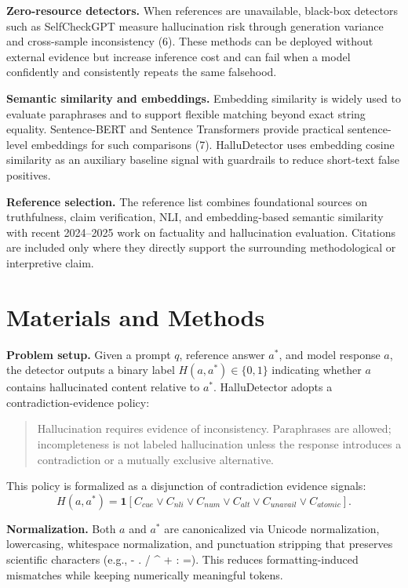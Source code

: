 \documentclass[11pt]{article}
\begin{document}
\textbf{Zero-resource detectors.} When references are unavailable, black-box detectors such as SelfCheckGPT measure hallucination risk through generation variance and cross-sample inconsistency (6). These methods can be deployed without external evidence but increase inference cost and can fail when a model confidently and consistently repeats the same falsehood.

\textbf{Semantic similarity and embeddings.} Embedding similarity is widely used to evaluate paraphrases and to support flexible matching beyond exact string equality. Sentence-BERT and Sentence Transformers provide practical sentence-level embeddings for such comparisons (7). HalluDetector uses embedding cosine similarity as an auxiliary baseline signal with guardrails to reduce short-text false positives.

\textbf{Reference selection.} The reference list combines foundational sources on truthfulness, claim verification, NLI, and embedding-based semantic similarity with recent 2024--2025 work on factuality and hallucination evaluation. Citations are included only where they directly support the surrounding methodological or interpretive claim.

\section*{Materials and Methods}
\textbf{Problem setup.} Given a prompt $q$, reference answer $a^*$, and model response $a$, the detector outputs a binary label $H(a,a^*) \in \{0,1\}$ indicating whether $a$ contains hallucinated content relative to $a^*$. HalluDetector adopts a contradiction-evidence policy:

\begin{quote}
Hallucination requires evidence of inconsistency. Paraphrases are allowed; incompleteness is not labeled hallucination unless the response introduces a contradiction or a mutually exclusive alternative.
\end{quote}

This policy is formalized as a disjunction of contradiction evidence signals:
\begin{equation}
H(a,a^*) = \mathbf{1}[C_{cue} \lor C_{nli} \lor C_{num} \lor C_{alt} \lor C_{unavail} \lor C_{atomic}].
\tag{eq1}
\end{equation}


\textbf{Normalization.} Both $a$ and $a^*$ are canonicalized via Unicode normalization, lowercasing, whitespace normalization, and punctuation stripping that preserves scientific characters (e.g., - . / \^{} + : =). This reduces formatting-induced mismatches while keeping numerically meaningful tokens.
\end{document}
